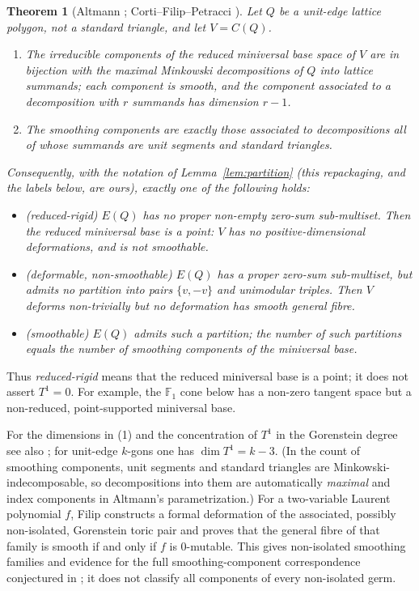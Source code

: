 \documentclass[11pt]{amsart}
\newtheorem{theorem}{Theorem}[section]
\theoremstyle{definition}
\theoremstyle{remark}
\newcommand{\FF}{\mathbb{F}}
\begin{document}
\begin{theorem}[Altmann \cite{Altmann97}; Corti--Filip--Petracci
{\cite[\S5.1]{CFP}}]\label{thm:trichotomy}
Let $Q$ be a unit-edge lattice polygon, not a standard triangle, and let
$V = C(Q)$.
\begin{enumerate}
\item The irreducible components of the reduced miniversal base space of $V$
are in bijection with the maximal Minkowski decompositions of $Q$ into lattice
summands; each component is smooth, and the component associated to a
decomposition with $r$ summands has dimension $r-1$.
\item The smoothing components are exactly those associated to decompositions
all of whose summands are unit segments and standard triangles.
\end{enumerate}
Consequently, with the notation of Lemma~\textup{\ref{lem:partition}} (this
repackaging, and the labels below, are ours), exactly
one of the following holds:
\begin{itemize}
\item[\textup{(R)}] \textup{(reduced-rigid)} $E(Q)$ has no proper non-empty zero-sum
sub-multiset.  Then the reduced miniversal base is a point: $V$ has no
positive-dimensional deformations, and is not smoothable.
\item[\textup{(D)}] \textup{(deformable, non-smoothable)} $E(Q)$ has a proper
zero-sum sub-multiset, but admits no partition into pairs $\{v,-v\}$ and
unimodular triples.  Then $V$ deforms non-trivially but no deformation has
smooth general fibre.
\item[\textup{(S)}] \textup{(smoothable)} $E(Q)$ admits such a partition; the
number of such partitions equals the number of smoothing components of the
miniversal base.
\end{itemize}
\end{theorem}

Thus \emph{reduced-rigid} means that the reduced miniversal base is a point;
it does not assert $T^1=0$.  For example, the
$\FF_1$ cone below has a non-zero tangent space but a non-reduced,
point-supported miniversal base.

For the dimensions in (1) and the concentration of $T^1$ in the Gorenstein
degree see also \cite{Altmann95}; for unit-edge $k$-gons one has
$\dim T^1 = k-3$.  (In the count of smoothing components, unit segments
and standard triangles are Minkowski-indecomposable, so decompositions
into them are automatically \emph{maximal} and index components in
Altmann's parametrization.)  For a two-variable Laurent polynomial $f$, Filip
\cite{Filip25} constructs a formal deformation of the associated, possibly
non-isolated, Gorenstein toric pair and proves that the general fibre of that
family is smooth if and only if $f$ is $0$-mutable.  This gives non-isolated
smoothing families and evidence for the full smoothing-component
correspondence conjectured in \cite{CFP}; it does not classify all components
of every non-isolated germ.
\end{document}

